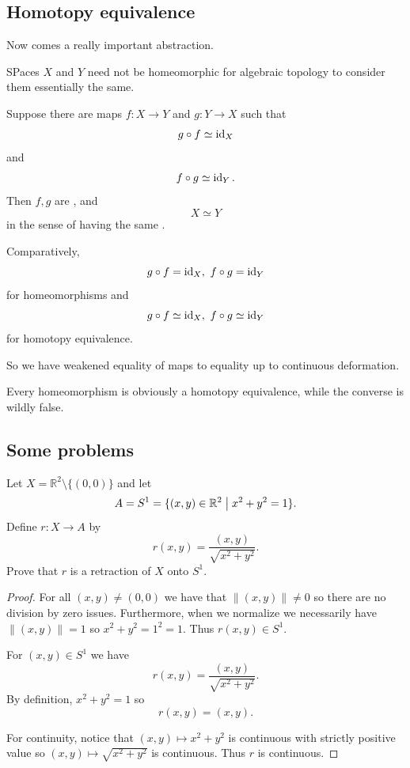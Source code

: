 \documentclass[11pt]{article}
\begin{document}
\subsection{Homotopy equivalence}

Now comes a really important abstraction. 

SPaces $X$ and $Y$ need not be homeomorphic 
for algebraic topology to consider them essentially 
the same. 

Suppose there are maps $f : X \to Y$ and $g : Y \to X$ 
such that 
\[
    g \circ f \simeq \operatorname{id}_X 
\]
and 
\[
    f \circ g \simeq \operatorname{id}_Y. 
\]
Then $f,g$ are , 
and 
\[
    X \simeq Y 
\]
in the sense of having the same . 

Comparatively, 
\[
    g \circ f = \operatorname{id}_X, \ f \circ g = \operatorname{id}_Y
\]
for homeomorphisms and 
\[
    g \circ f \simeq \operatorname{id}_X, \ f \circ g \simeq 
    \operatorname{id}_Y 
\] 
for homotopy equivalence. 

So we have weakened equality of maps to 
equality up to continuous deformation. 

Every homeomorphism is obviously a 
homotopy equivalence, while 
the converse is wildly false. 

\subsection{Some problems}

\begin{prob}
    Let $X = \mathbb R^2 \setminus \{(0,0)\}$ and let 
    \[
        A = S^1 = 
        \{(x,y) \in \mathbb R^2 \bigm| 
        x^2 + y^2 = 1\}. 
    \]
    Define $r : X \to A$ by 
    \[
        r(x,y) = \frac{(x,y)}{\sqrt{x^2 + y^2}}. 
    \]
    Prove that $r$ is a retraction of 
    $X$ onto $S^1$. 
\end{prob}
\begin{proof}
    For all $(x,y) \neq (0,0)$ we have that 
    $\|(x,y)\| \neq 0$ so there are no division by 
    zero issues. 
    Furthermore, when we normalize we necessarily have 
    $\|(x,y)\| = 1$ so $x^2 + y^2 = 1^2 = 1$. 
    Thus $r(x,y) \in S^1$.

    For $(x,y) \in S^1$ we have 
    \[
        r(x,y) = \frac{(x,y)}{\sqrt{x^2 + y^2}}. 
    \]
    By definition, $x^2 + y^2 = 1$ so 
    \[
        r(x,y) = (x,y). 
    \]

    For continuity, notice that 
    $(x,y) \mapsto x^2 + y^2$ is continuous with 
    strictly positive value so 
    $(x,y) \mapsto \sqrt{x^2 + y^2}$ is continuous. 
    Thus $r$ is continuous.
\end{proof}
\end{document}
